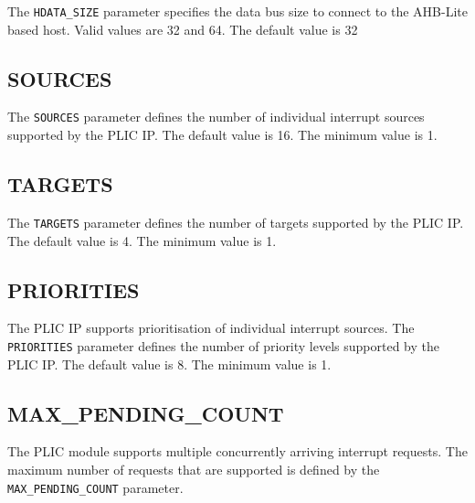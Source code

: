 The \texttt{HDATA\_SIZE} parameter specifies the data bus size to
connect to the AHB-Lite based host. Valid values are 32 and 64. The
default value is 32

\hypertarget{SOURCES}{\subsection{SOURCES}\label{sec:SOURCES}}

The \texttt{SOURCES} parameter defines the number of individual
interrupt sources supported by the PLIC IP. The default value is 16. The
minimum value is 1.

\hypertarget{TARGETS}{\subsection{TARGETS}\label{sec:TARGETS}}

The \texttt{TARGETS} parameter defines the number of targets supported
by the PLIC IP. The default value is 4. The minimum value is 1.

\subsection{PRIORITIES}

\sloppy
The PLIC IP supports prioritisation of individual interrupt sources. The \texttt{PRIORITIES} parameter defines the number of priority levels supported by the PLIC IP. The default value is 8. The minimum value is 1.

\subsection{MAX\_PENDING\_COUNT}

\sloppy
The PLIC module supports multiple concurrently arriving interrupt
requests. The maximum number of requests that are supported is defined
by the \texttt{MAX\_PENDING\_COUNT} parameter.

\begin{comment}
This is unclear.
The MAX_PENDING_COUNT parameter determines how many edge triggered interrupts can be queued. This is per interrupt-source. Each interrupt-source has an interrupt-pending-counter. MAX_PENDING_COUNT indicates the max.number this counter can hold.
If there are more interrupts pending than the counter can hold, then the counter retains its value (ie it 'hit' a ceiling).
The minimum value, of course, is 0, which indicates no pending interrupt.
\end{comment}

